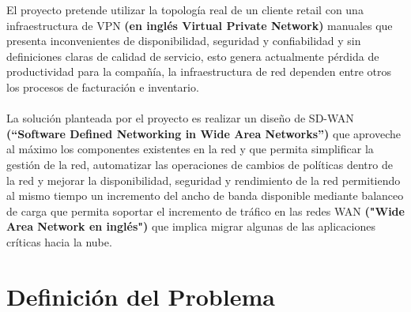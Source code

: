 
	El proyecto pretende utilizar la topología real de un cliente retail con una infraestructura de VPN \textbf{(en inglés Virtual Private Network)} manuales que presenta inconvenientes de disponibilidad, seguridad y confiabilidad y sin definiciones claras de calidad de servicio, esto genera actualmente pérdida de productividad para la compañía, la infraestructura de red dependen entre otros los procesos de facturación e inventario.
\\
\\
La solución planteada por el proyecto es realizar un diseño de SD-WAN \textbf{(“Software Defined Networking in Wide Area Networks”)} que aproveche al máximo los componentes existentes en la red y que permita simplificar la gestión de la red, automatizar las operaciones de cambios de políticas dentro de la red y mejorar la disponibilidad, seguridad y rendimiento de la red permitiendo al mismo tiempo un incremento del ancho de banda disponible mediante balanceo de carga que permita soportar el incremento de tráfico en las redes WAN \textbf{("Wide Area Network en inglés")} que implica migrar algunas de las aplicaciones críticas hacia la nube.


\section{Definición del Problema} %
\label{Definición del Problema}

